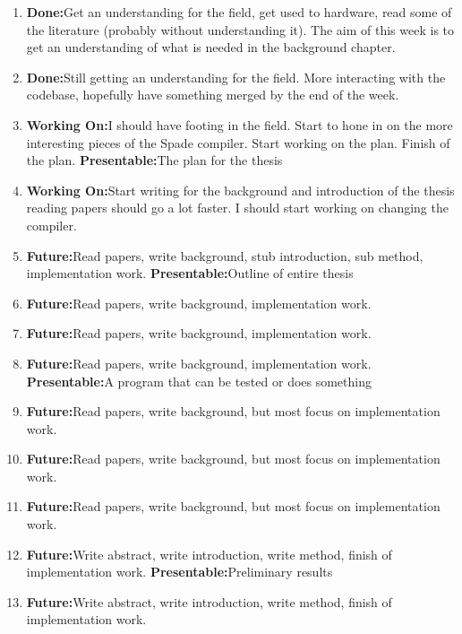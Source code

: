 \documentclass[msc,lith,english]{liuthesis}
\begin{document}
\newcommand{\done}[0]{\textbf{Done:}\hspace{0.2em}}
\newcommand{\curr}[0]{\textbf{Working On:}\hspace{0.2em}} %
\newcommand{\futr}[0]{\textbf{Future:}\hspace{0.2em}}
\newcommand{\presentable}[1]{\newline{}\textbf{Presentable:}\hspace{0.2em}#1}

\begin{enumerate}
  \item \done Get an understanding for the field, get used to hardware, read some of the literature (probably without understanding it). The aim of this week is to get an understanding of what is needed in the background chapter.
  \item \done Still getting an understanding for the field. More interacting with the codebase, hopefully have something merged by the end of the week. 
  \item \curr I should have footing in the field. Start to hone in on the more interesting pieces of the Spade compiler. Start working on the plan. Finish of the plan. \presentable{The plan for the thesis}
  \item \curr Start writing for the background and introduction of the thesis reading papers should go a lot faster. I should start working on changing the compiler. 
  \item \futr Read papers, write background, stub introduction, sub method, implementation work. \presentable{Outline of entire thesis} 
  \item \futr Read papers, write background, implementation work. 
  \item \futr Read papers, write background, implementation work. 
  \item \futr Read papers, write background, implementation work. \presentable{A program that can be tested or does something} 
  \item \futr Read papers, write background, but most focus on implementation work.
  \item \futr Read papers, write background, but most focus on implementation work.
  \item \futr Read papers, write background, but most focus on implementation work.
  \item \futr Write abstract, write introduction, write method, finish of implementation work. \presentable{Preliminary results} 
  \item \futr Write abstract, write introduction, write method, finish of implementation work. 

\end{enumerate}
\end{document}
